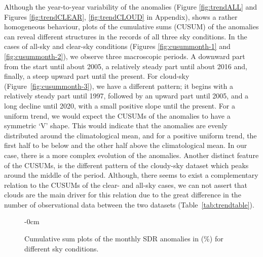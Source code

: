 \documentclass[applsci,article,submit,moreauthors,pdftex]{Definitions/mdpi}
\begin{document}
Although the year-to-year variability of the anomalies (Figure
\ref{fig:trendALL} and Figures \ref{fig:trendCLEAR},
\ref{fig:trendCLOUD} in Appendix), shows a rather homogeneous behaviour,
plots of the cumulative sums (CUSUM) \citep{Regier2019} of the anomalies
can reveal different structures in the records of all three sky
conditions. In the cases of all-sky and clear-sky conditions (Figures
\ref{fig:cusummonth-1} and \ref{fig:cusummonth-2}), we observe three
macroscopic periods. A downward part from the start until about 2005, a
relatively steady part until about 2016 and, finally, a steep upward
part until the present. For cloud-sky (Figure~\ref{fig:cusummonth-3}),
we have a different pattern; it begins with a relatively steady part
until 1997, followed by an upward part until 2005, and a long decline
until 2020, with a small positive slope until the present. For a uniform
trend, we would expect the CUSUMs of the anomalies to have a symmetric
`V' shape. This would indicate that the anomalies are evenly distributed
around the climatological mean, and for a positive uniform trend, the
first half to be below and the other half above the climatological mean.
In our case, there is a more complex evolution of the anomalies. Another
distinct feature of the CUSUMs, is the different pattern of the
cloudy-sky dataset which peaks around the middle of the period.
Although, there seems to exist a complementary relation to the CUSUMs of
the clear- and all-sky cases, we can not assert that clouds are the main
driver for this relation due to the great difference in the number of
observational data between the two datasets
(Table~\ref{tab:trendtable}).

\begin{figure}[h!]
    \begin{adjustwidth}{-\extralength}{0cm}
        {\centering 
        \hfill
        \hfill
        \hfill
        }
\caption{Cumulative sum plots of the monthly SDR anomalies in (\%) for different sky conditions.}\label{fig:cusummonth}
\end{adjustwidth}
\end{figure}
\end{document}
